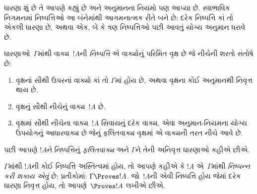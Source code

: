 \label{guunit:OLP-0088}


\begin{explain}
ધારણા શું છે તે આપણે કહ્યું છે અને અનુમાનના નિયમો પણ આપ્યા છે.
સ્વાભાવિક નિગમનમાં નિષ્પત્તિઓ આ બંનેમાંથી આગમનાત્મક રીતે બને છે:
દરેક નિષ્પત્તિ કાં તો એકલી ધારણા છે, અથવા એક, બે કે ત્રણ
નિષ્પત્તિઓ પછી આવતું યોગ્ય અનુમાન ધરાવે છે.
\end{explain}

\begin{defn}[નિષ્પત્તિ]
ધારણાઓ~$\Gamma$માંથી વાક્ય~$!A$ની \emph{નિષ્પત્તિ} એ
વાક્યોનું પરિમિત વૃક્ષ છે જે નીચેની શરતો સંતોષે છે:
\begin{enumerate}
\item વૃક્ષનાં સૌથી ઉપરનાં વાક્યો કાં તો $\Gamma$માં હોય છે,
  અથવા વૃક્ષના કોઈ અનુમાનથી નિવૃત્ત થાય છે.
\item વૃક્ષનું સૌથી નીચેનું વાક્ય~$!A$ છે.
\item વૃક્ષમાં સૌથી નીચેના વાક્ય~$!A$ સિવાયનું દરેક વાક્ય,
  એવા અનુમાન-નિયમના યોગ્ય ઉપયોગનું આધારવાક્ય છે જેનું ફલિતવાક્ય
  વૃક્ષમાં એ વાક્યની તરત નીચે આવે છે.
\end{enumerate}
પછી આપણે $!A$ને નિષ્પત્તિનું \emph{ફલિતવાક્ય} અને $\Gamma$ને
તેની અનિવૃત્ત ધારણાઓ કહીએ છીએ.

$\Gamma$માંથી $!A$ની કોઈ નિષ્પત્તિ અસ્તિત્વમાં હોય, તો આપણે
કહીએ કે $!A$ એ~$\Gamma$માંથી \emph{નિષ્પન્ન કરી શકાય એવું} છે; પ્રતીકોમાં:
$\Gamma \Proves !A$. જો~$!A$ની એવી નિષ્પત્તિ હોય જેમાં દરેક
ધારણા નિવૃત્ત હોય, તો આપણે~$\Proves !A$ લખીએ છીએ.
\end{defn}

